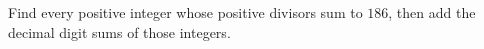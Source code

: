 Find every positive integer whose positive divisors sum to $186$, then add the decimal digit sums of those integers.
